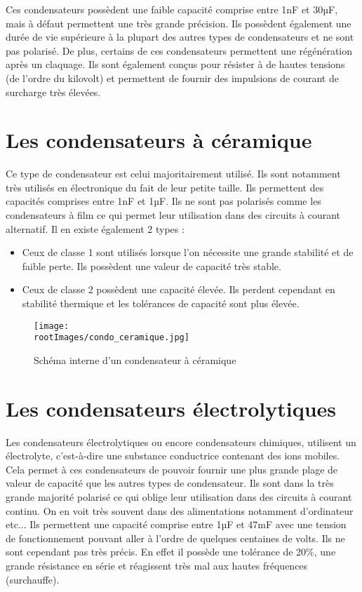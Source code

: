 \documentclass[12pt]{report}
\begin{document}
Ces condensateurs possèdent une faible capacité comprise entre 1nF et 30µF, mais à défaut permettent une très grande précision. Ils possèdent également une durée de vie supérieure à la plupart des autres types de condensateurs et ne sont pas polarisé. De plus, certains de ces condensateurs permettent une régénération après un claquage. Ils sont également conçus pour résister à de hautes tensions (de l’ordre du kilovolt) et permettent de fournir des impulsions de courant de surcharge très élevées.

\newpage
\section{Les condensateurs à céramique}

Ce type de condensateur est celui majoritairement utilisé. Ils sont notamment très utilisés en électronique du fait de leur petite taille. Ils permettent des capacités comprises entre 1nF et 1µF. Ils ne sont pas polarisés comme les condensateurs à film ce qui permet leur utilisation dans des circuits à courant alternatif. Il en existe également 2 types :\\

\begin{itemize}
    \item Ceux de classe 1 sont utilisés lorsque l’on nécessite une grande stabilité et de faible perte. Ils possèdent une valeur de capacité très stable.\\
    \item Ceux de classe 2 possèdent une capacité élevée. Ils perdent cependant en stabilité thermique et les tolérances de capacité sont plus élevée.
\end{itemize}

\begin{figure}[!h]
    \centering
    \texttt{[image: \\rootImages/condo\_ceramique.jpg]}
    \caption{Schéma interne d'un condensateur à céramique}
\end{figure}


\newpage
\section{Les condensateurs électrolytiques}

Les condensateurs électrolytiques ou encore condensateurs chimiques, utilisent un électrolyte, c’est-à-dire une substance conductrice contenant des ions mobiles. Cela permet à ces condensateurs de pouvoir fournir une plus grande plage de valeur de capacité que les autres types de condensateur. Ils sont dans la très grande majorité polarisé ce qui oblige leur utilisation dans des circuits à courant continu. On en voit très souvent dans des alimentations notamment d'ordinateur etc... Ils permettent une capacité comprise entre 1µF et 47mF avec une tension de fonctionnement pouvant aller à l’ordre de quelques centaines de volts. Ils ne sont cependant pas très précis. En effet il possède une tolérance de 20\%, une grande résistance en série et réagissent très mal aux hautes fréquences (surchauffe). 
\end{document}
